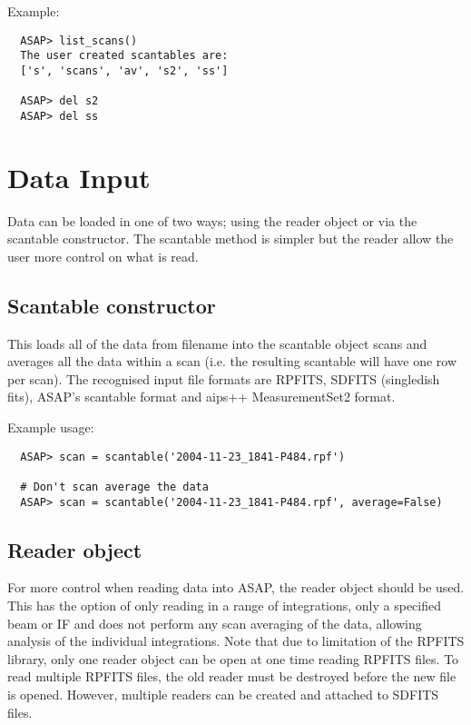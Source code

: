 \documentclass[11pt]{article}
\begin{document}
Example:

\begin{verbatim}
  ASAP> list_scans()
  The user created scantables are:
  ['s', 'scans', 'av', 's2', 'ss']

  ASAP> del s2
  ASAP> del ss
\end{verbatim}

\section{Data Input}

Data can be loaded in one of two ways; using the reader object or via
the scantable constructor. The scantable method is simpler but the
reader allow the user more control on what is read.

\subsection{Scantable constructor}

This loads
all of the data from filename into the scantable object scans and
averages all the data within a scan (i.e.  the resulting scantable
will have one row per scan).  The recognised input file formats are
RPFITS, SDFITS (singledish fits), ASAP's scantable format and aips++
MeasurementSet2 format.

Example usage:

\begin{verbatim}
  ASAP> scan = scantable('2004-11-23_1841-P484.rpf')

  # Don't scan average the data
  ASAP> scan = scantable('2004-11-23_1841-P484.rpf', average=False)
\end{verbatim}


\subsection{Reader object}

For more control
when reading data into ASAP, the reader object should be used.  This
has the option of only reading in a range of integrations, only a
specified beam or IF and does not perform any scan averaging of the
data, allowing analysis of the individual integrations.  Note that due
to limitation of the RPFITS library, only one reader object can be
open at one time reading RPFITS files.  To read multiple RPFITS files,
the old reader must be destroyed before the new file is opened.
However, multiple readers can be created and attached to SDFITS files.
\end{document}
